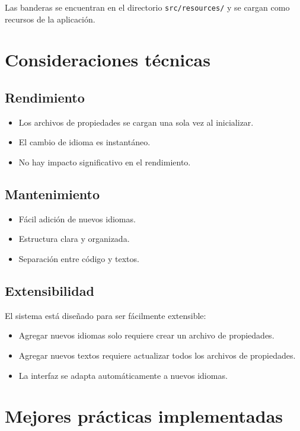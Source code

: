Las banderas se encuentran en el directorio \texttt{src/resources/} y se cargan como recursos de la aplicación.

\section{Consideraciones técnicas}

\subsection{Rendimiento}

\begin{itemize}
    \item Los archivos de propiedades se cargan una sola vez al inicializar.
    \item El cambio de idioma es instantáneo.
    \item No hay impacto significativo en el rendimiento.
\end{itemize}

\subsection{Mantenimiento}

\begin{itemize}
    \item Fácil adición de nuevos idiomas.
    \item Estructura clara y organizada.
    \item Separación entre código y textos.
\end{itemize}

\subsection{Extensibilidad}

El sistema está diseñado para ser fácilmente extensible:

\begin{itemize}
    \item Agregar nuevos idiomas solo requiere crear un archivo de propiedades.
    \item Agregar nuevos textos requiere actualizar todos los archivos de propiedades.
    \item La interfaz se adapta automáticamente a nuevos idiomas.
\end{itemize}

\section{Mejores prácticas implementadas}

